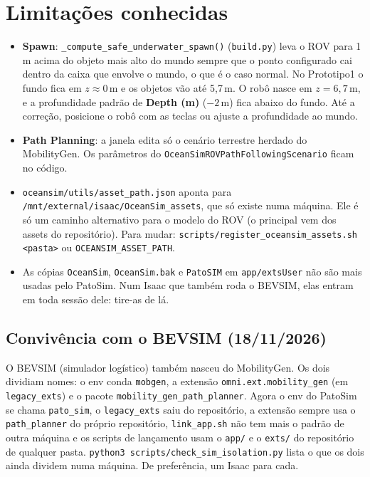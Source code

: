 \documentclass[10pt,a4paper]{article}
\newcommand{\arq}[1]{\texttt{#1}}
\newcommand{\nome}[1]{\nolinkurl{#1}}
\begin{document}
\section{Limitações conhecidas}
\begin{itemize}
  \item \textbf{Spawn}: \arq{\_compute\_safe\_underwater\_spawn()} (\arq{build.py}) leva o ROV para 1\,m acima do objeto
        mais alto do mundo sempre que o ponto configurado cai dentro da caixa que envolve o mundo, o que é o caso
        normal. No Prototipo1 o fundo fica em $z\approx0$\,m e os objetos vão até 5,7\,m. O robô nasce em $z=6{,}7$\,m,
        e a profundidade padrão de \textbf{Depth (m)} ($-2$\,m) fica abaixo do fundo. Até a correção, posicione o
        robô com as teclas ou ajuste a profundidade ao mundo.
  
  \item \textbf{Path Planning}: a janela edita só o cenário terrestre herdado do MobilityGen. Os parâmetros do
        \nome{OceanSimROVPathFollowingScenario} ficam no código.
  \item \arq{oceansim/utils/asset\_path.json} aponta para \arq{/mnt/external/isaac/OceanSim\_assets}, que só existe numa
        máquina. Ele é só um caminho alternativo para o modelo do ROV (o principal vem dos assets do repositório).
        Para mudar: \arq{scripts/register\_oceansim\_assets.sh <pasta>} ou \arq{OCEANSIM\_ASSET\_PATH}.
  \item As cópias \arq{OceanSim}, \arq{OceanSim.bak} e \arq{PatoSIM} em \arq{app/extsUser} não são mais usadas pelo
        PatoSim. Num Isaac que também roda o BEVSIM, elas entram em toda sessão dele: tire-as de lá.
\end{itemize}

\subsection*{Convivência com o BEVSIM (18/11/2026)}
O BEVSIM (simulador logístico) também nasceu do MobilityGen. Os dois dividiam nomes: o env conda \arq{mobgen}, a
extensão \nome{omni.ext.mobility_gen} (em \arq{legacy\_exts}) e o pacote \arq{mobility\_gen\_path\_planner}. Agora o env
do PatoSim se chama \arq{pato\_sim}, o \arq{legacy\_exts} saiu do repositório, a extensão sempre usa o
\arq{path\_planner} do próprio repositório, \arq{link\_app.sh} não tem mais o padrão de outra máquina e os scripts de
lançamento usam o \arq{app/} e o \arq{exts/} do repositório de qualquer pasta. \arq{python3
scripts/check\_sim\_isolation.py} lista o que os dois ainda dividem numa máquina. De preferência, um Isaac para cada.
\end{document}
